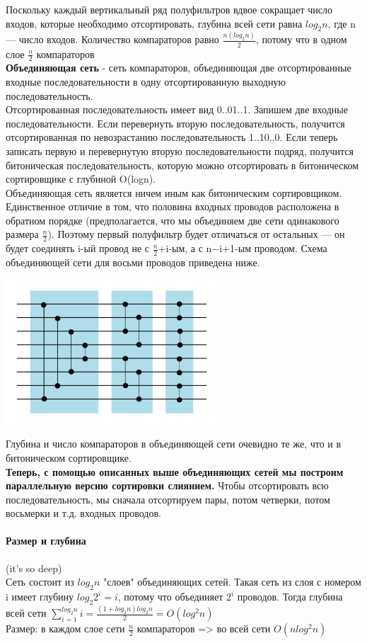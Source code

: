 \documentclass[a4paper,10pt]{article}
\begin{document}
 Поскольку каждый вертикальный ряд полуфильтров вдвое сокращает число входов, которые необходимо отсортировать, глубина всей сети равна $log_2n$, где n — число входов. Количество компараторов равно $\frac{n(log_2n)}{2}$, потому что в одном слое $\frac{n}{2}$ компараторов\\
\textbf{Объединяющая сеть} - сеть компараторов, объединяющая две отсортированные входные последовательности в одну отсортированную выходную последовательность.\\
Отсортированная последовательность имеет вид 0..01..1. Запишем две входные последовательности. Если перевернуть вторую последовательность, получится отсортированная по невозрастанию последовательность 1..10..0. Если теперь записать первую и перевернутую вторую последовательности подряд, получится битоническая последовательность, которую можно отсортировать в битоническом сортировщике с глубиной O(logn).\\
Объединяющая сеть является ничем иным как битоническим сортировщиком. Единственное отличие в том, что половина входных проводов расположена в обратном порядке (предполагается, что мы объединяем две сети одинакового размера $\frac{n}{2}$). Поэтому первый полуфильтр будет отличаться от остальных — он будет соединять i-ый провод не с $\frac{n}{2}$+i-ым, а с n−i+1-ым проводом. Схема объединяющей сети для восьми проводов приведена ниже.
\begin{center}\includegraphics[scale=0.5]{snet3.png}\end{center}
Глубина и число компараторов в объединяющей сети очевидно те же, что и в битоническом сортировщике.\\
\textbf{Теперь, с помощью описанных выше объединяющих сетей мы построим параллельную версию сортировки слиянием.}
Чтобы отсортировать всю последовательность, мы сначала отсортируем пары, потом четверки, потом восьмерки и т.д. входных проводов.\\
\paragraph{Размер и глубина}(it's so deep)\\
Сеть состоит из $log_2n$ "слоев" объединяющих сетей. Такая сеть из слоя с номером i имеет глубину $log_2 2^i = i$, потому что объединяет $2^i$ проводов. Тогда глубина всей сети $\sum_{i=1}^{log_2n}{i}=\frac{(1+log_2n)log_2n}{2} = O(log^2n)$\\
Размер: в каждом слое сети $\frac{n}{2}$ компараторов => во всей сети $O(nlog^2n)$
\end{document}
